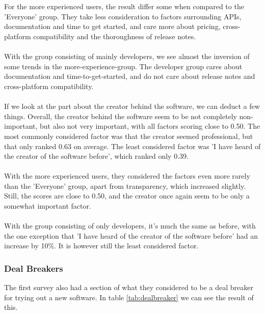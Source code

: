 \documentclass{article}
\begin{document}
\\ \\
For the more experienced users, the result differ some when compared to the 'Everyone' group. They take less consideration to factors surrounding APIs, documentation and time to get started, and care more about pricing,
cross-platform compatibility and the thoroughness of release notes.
\\ \\
With the group consisting of mainly developers, we see almost the
inversion of some trends in the more-experience-group. The developer
group cares about documentation and time-to-get-started, and do not care
about release notes and cross-platform compatibility.
\\ \\
If we look at the part about the creator behind the software, we can deduct a few things.
Overall, the creator behind the software seem to be not completely non-important,
but also not very important, with all factors scoring close to 0.50. The most
commonly considered factor was that the creator seemed professional, but
that only ranked 0.63 on average. The least considered factor was 'I have heard of
the creator of the software before', which ranked only 0.39.
\\ \\
With the more experienced users, they considered the factors even more
rarely than the 'Everyone' group, apart from transparency, which increased
slightly. Still, the scores are close to 0.50, and the creator once again
seem to be only a somewhat important factor.
\\ \\
With the group consisting of only developers, it's much the same as
before, with the one exception that 'I have heard of the creator of the
software before' had an increase by 10\%. It is however still the least
considered factor.
\subsubsection{Deal Breakers}
The first survey also had a section of what they considered to be a deal breaker for trying out a new software.
In table \ref{tab:dealbreaker} we can see the result of this.
\end{document}
